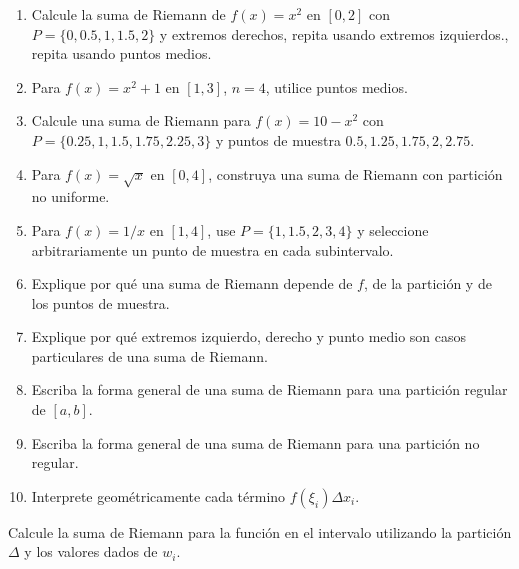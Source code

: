 \documentclass[12pt]{article}
\begin{document}
\begin{enumerate}[resume]
\item Calcule la suma de Riemann de $f(x)=x^2$ en $[0,2]$ con $P=\{0,0.5,1,1.5,2\}$ y extremos derechos, repita usando extremos izquierdos., repita usando puntos medios.
\item Para $f(x)=x^2+1$ en $[1,3]$, $n=4$, utilice puntos medios.
\item Calcule una suma de Riemann para $f(x)=10-x^2$ con $P=\{0.25,1,1.5,1.75,2.25,3\}$ y puntos de muestra $0.5,1.25,1.75,2,2.75$.
\item Para $f(x)=\sqrt{x}$ en $[0,4]$, construya una suma de Riemann con partición no uniforme.
\item Para $f(x)=1/x$ en $[1,4]$, use $P=\{1,1.5,2,3,4\}$ y seleccione arbitrariamente un punto de muestra en cada subintervalo.
\item Explique por qué una suma de Riemann depende de $f$, de la partición y de los puntos de muestra.
\item Explique por qué extremos izquierdo, derecho y punto medio son casos particulares de una suma de Riemann.
\item Escriba la forma general de una suma de Riemann para una partición regular de $[a,b]$.
\item Escriba la forma general de una suma de Riemann para una partición no regular.
\item Interprete geométricamente cada término $f(\xi_i)\Delta x_i$.
\end{enumerate}


Calcule la suma de Riemann para la función en el intervalo utilizando la partición $\Delta$ y los valores dados de $w_i$.
\end{document}
